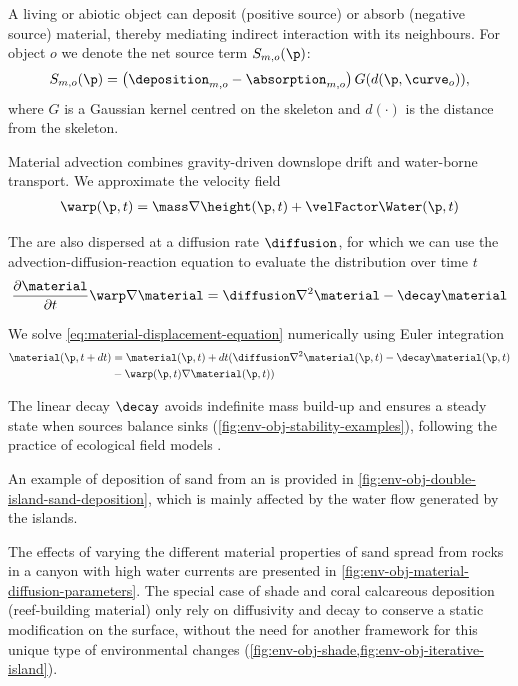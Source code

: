 A living or abiotic object can deposit (positive source) or absorb (negative source) material, thereby mediating indirect interaction with its neighbours.  For object $o$ we denote the net source term $S_{m,o}(\p)$:
\begin{align}
    S_{m,o}(\p) = \left(\deposition_{m,o} - \absorption_{m,o}\right) G(d(\p,\curve_o)),
\end{align}
where $G$ is a Gaussian kernel centred on the skeleton and $d(\cdot)$ is the distance from the skeleton.


Material advection combines gravity-driven downslope drift and water-borne transport.  We approximate the velocity field
\begin{align}
    \warp(\p, t) = \mass \nabla \height(\p, t) + \velFactor \Water(\p, t)
\end{align}

The  are also dispersed at a diffusion rate $\diffusion$, for which we can use the advection-diffusion-reaction equation to evaluate the distribution over time $t$
\begin{align} 
	\label{eq:material-displacement-equation}
    \frac{\partial \material}{\partial t} \warp \nabla \material = \diffusion \nabla^2 \material - \decay \material
\end{align}

We solve \eqref{eq:material-displacement-equation} numerically using Euler integration
\begin{align}
    \material(\p, t + dt) &= \material(\p, t) + dt ( \diffusion \nabla^2 \material(\p, t) - \decay \material(\p, t) \\ & - \warp(\p, t) \nabla \material(\p, t) ) \nonumber
\end{align}

The linear decay $\decay$ avoids indefinite mass build-up and ensures a steady state when sources balance sinks (\cref{fig:env-obj-stability-examples}), following the practice of ecological field models \cite{Seidl2012}.

An example of deposition of sand from an  is provided in \cref{fig:env-obj-double-island-sand-deposition}, which is mainly affected by the water flow generated by the islands.

The effects of varying the different material properties of sand spread from rocks in a canyon with high water currents are presented in \cref{fig:env-obj-material-diffusion-parameters}. The special case of shade and coral calcareous deposition (reef-building material) only rely on diffusivity and decay to conserve a static modification on the surface, without the need for another framework for this unique type of environmental changes (\cref{fig:env-obj-shade,fig:env-obj-iterative-island}).

